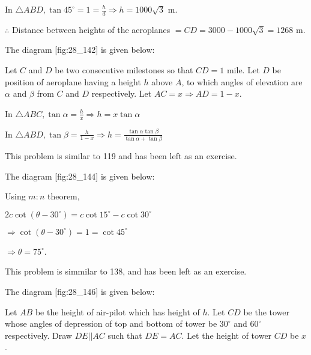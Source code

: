   In $\triangle ABD, \tan45^\circ = 1 = \frac{h}{d} \Rightarrow h = 1000\sqrt{3}$ m.

  $\therefore$ Distance between heights of the aeroplanes $= CD = 3000 - 1000\sqrt{3} =
  1268$ m.

\item The diagram [fig:28_142] is given below:

  \startplacefigure[reference=fig:28_142]
    \externalfigure[28_142.pdf]
  \stopplacefigure

  Let $C$ and $D$ be two consecutive milestones so that $CD = 1$ mile. Let $D$ be
  position of aeroplane having a height $h$ above $A$, to which angles of elevation are
  $\alpha$ and $\beta$ from $C$ and $D$ respectively. Let $AC = x
  \Rightarrow AD = 1 - x$.

  In $\triangle ABC, \tan\alpha = \frac{h}{x} \Rightarrow h = x\tan\alpha$

  In $\triangle ABD, \tan\beta = \frac{h}{1 - x} \Rightarrow h =
  \frac{\tan\alpha\tan\beta}{\tan\alpha + \tan\beta}$

\item This problem is similar to 119 and has been left as an exercise.

\item The diagram [fig:28_144] is given below:

  \startplacefigure[reference=fig:28_144]
    \externalfigure[28_144.pdf]
  \stopplacefigure

  Using $m:n$ theorem,

  $2c\cot(\theta - 30^\circ) = c\cot15^\circ - c\cot30^\circ$

  $\Rightarrow \cot(\theta - 30^\circ) = 1 = \cot45^\circ$

  $\Rightarrow \theta = 75^\circ$.

\item This problem is simmilar to 138, and has been left as an exercise.

\item The diagram [fig:28_146] is given below:

  \startplacefigure[reference=fig:28_146]
    \externalfigure[28_146.pdf]
  \stopplacefigure

  Let $AB$ be the height of air-pilot which has height of $h$. Let $CD$ be the tower
  whose angles of depression of top and bottom of tower be $30^\circ$ and $60^\circ$
  respectively. Draw $DE||AC$ such that $DE = AC$. Let the height of tower $CD$ be
  $x$.

